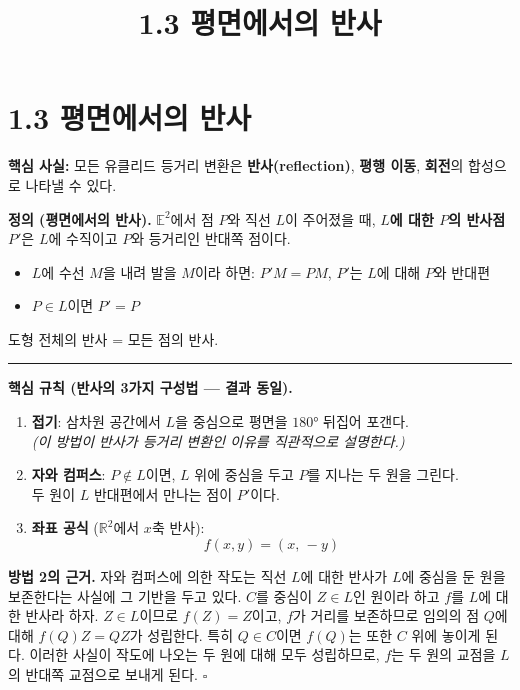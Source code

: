 \documentclass{article}
\title{1.3 평면에서의 반사}
\date{}
\author{}
\begin{document}
\maketitle

\section*{1.3 평면에서의 반사}

\textbf{핵심 사실:} 모든 유클리드 등거리 변환은 \textbf{반사(reflection)}, \textbf{평행 이동}, \textbf{회전}의 합성으로 나타낼 수 있다.

\begin{tcolorbox}[
  colback=teal!4, colframe=teal!65!black,
  title=정의 \& 핵심 규칙,
  fonttitle=\bfseries, boxrule=0.5mm, arc=3mm]

\textbf{\textcolor{teal!65!black}{정의 (평면에서의 반사).}}\quad
$\mathbb{E}^2$에서 점 $P$와 직선 $L$이 주어졌을 때, \textbf{$L$에 대한 $P$의 반사점} $P'$은
$L$에 수직이고 $P$와 등거리인 반대쪽 점이다.
\begin{itemize}\setlength\itemsep{0pt}
  \item $L$에 수선 $M$을 내려 발을 $M$이라 하면: $P'M = PM$, $P'$는 $L$에 대해 $P$와 반대편
  \item $P \in L$이면 $P' = P$
\end{itemize}
도형 전체의 반사 = 모든 점의 반사.

\noindent\textcolor{teal!50!black}{\rule{\linewidth}{0.4pt}}

\textbf{\textcolor{teal!65!black}{핵심 규칙 (반사의 3가지 구성법 --- 결과 동일).}}
\begin{enumerate}\setlength\itemsep{2pt}
  \item \textbf{접기}: 삼차원 공간에서 $L$을 중심으로 평면을 $180°$ 뒤집어 포갠다.\\
    \textit{(이 방법이 반사가 등거리 변환인 이유를 직관적으로 설명한다.)}
  \item \textbf{자와 컴퍼스}: $P \notin L$이면, $L$ 위에 중심을 두고 $P$를 지나는 두 원을 그린다.\\
    두 원이 $L$ 반대편에서 만나는 점이 $P'$이다.
  \item \textbf{좌표 공식} ($\mathbb{R}^2$에서 $x$축 반사):
  \[
    f(x, y) = (x,\,-y)
  \]
\end{enumerate}

\end{tcolorbox}

\textbf{방법 2의 근거.}\quad
자와 컴퍼스에 의한 작도는 직선 $L$에 대한 반사가 $L$에 중심을 둔 원을 보존한다는 사실에 그 기반을 두고 있다.
$C$를 중심이 $Z \in L$인 원이라 하고 $f$를 $L$에 대한 반사라 하자.
$Z \in L$이므로 $f(Z) = Z$이고, $f$가 거리를 보존하므로 임의의 점 $Q$에 대해 $f(Q)Z = QZ$가 성립한다.
특히 $Q \in C$이면 $f(Q)$는 또한 $C$ 위에 놓이게 된다.
이러한 사실이 작도에 나오는 두 원에 대해 모두 성립하므로,
$f$는 두 원의 교점을 $L$의 반대쪽 교점으로 보내게 된다.
\hfill $\square$
\end{document}
